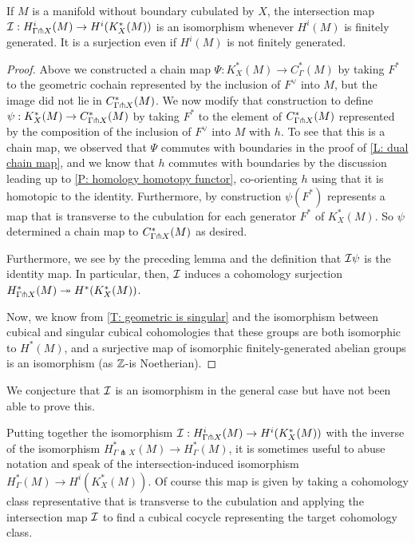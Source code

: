 \begin{theorem}\label{T: intersection qi}
If $M$ is a manifold without boundary cubulated by $X$, the intersection map $\mathcal{I}: H^i_{\Gamma\pitchfork X}(M)\to H^i(K_X^*(M))$ is an isomorphism whenever $H^i(M)$ is finitely generated. It is a surjection even if $H^i(M)$ is not finitely generated.
\end{theorem}
\begin{proof}
Above we constructed a chain map $\Psi:K_X^*(M)\to C_\Gamma^*(M)$ by taking $F^*$ to the geometric cochain represented by the inclusion of $F^\vee$ into $M$, but the image did not lie in $C^*_{\Gamma\pitchfork X}(M)$. We now modify that construction to define $\psi:K_X^*(M)\to C_{\Gamma\pitchfork X}^*(M)$ by taking $F^*$ to the element of $C^*_{\Gamma\pitchfork X}(M)$ represented by the composition of the inclusion of $F^\vee$ into $M$ with $h$. To see that this is a chain map, we observed that $\Psi$ commutes with boundaries in the proof of \cref{L: dual chain map}, and we know that $h$ commutes with boundaries by the discussion leading up to \cref{P: homology homotopy functor}, co-orienting $h$ using that it is homotopic to the identity. Furthermore, by construction $\psi(F^*)$ represents a map that is transverse to the cubulation for each generator $F^*$ of $K_X^*(M)$. So $\psi$ determined a chain map to $C_{\Gamma\pitchfork X}^*(M)$ as desired.

 Furthermore, we see by the preceding lemma and the definition that $\mathcal{I}\psi$ is the identity map. In particular, then, $\mathcal{I}$ induces a cohomology surjection  $H^*_{\Gamma\pitchfork X}(M)\twoheadrightarrow H^*(K_X^*(M))$.

Now, we know from \cref{T: geometric is singular} and the isomorphism between cubical and singular cubical cohomologies that these groups are both isomorphic to $H^*(M)$, and a surjective map of isomorphic finitely-generated abelian groups is an isomorphism (as $\mathbb{Z}$-is Noetherian).
\end{proof}

We conjecture that $\mathcal{I}$ is an isomorphism in the general case but have not been able to prove this.


\begin{remark}\label{R: intersection map extension}
Putting together the isomorphism  $\mathcal{I}: H^i_{\Gamma\pitchfork X}(M)\to H^i(K_X^*(M))$ with the inverse of the isomorphism $H^*_{\Gamma \pitchfork X}(M)\to  H^*_\Gamma(M)$, it is sometimes useful to abuse notation and speak of the intersection-induced isomorphism
 $H^*_\Gamma(M)\to H^i(K_X^*(M))$. Of course this map is given by taking a cohomology class representative that is transverse to the cubulation and applying the intersection map $\mathcal{I}$ to find a cubical cocycle representing the target cohomology class.
\end{remark}




